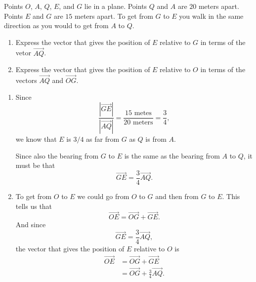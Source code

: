 \documentclass{ximera}
\begin{document}
\begin{question} \label{QLdfreFefrer}
Points $O$, $A$, $Q$, $E$, and $G$ lie in a plane. Points $Q$ and $A$ are $20$ meters apart. Points $E$ and $G$ are $15$ meters apart. To get from $G$ to $E$ you walk in the same direction as you would to get from $A$ to $Q$.

\begin{enumerate}
\item Express the vector that gives the position of $E$ relative to $G$ in terms of the vetor $\overrightarrow{AQ}$.

\item Express the vector that gives the position of $E$ relative to $O$ in terms of the vectors $\overrightarrow{AQ}$ and $\overrightarrow{OG}$.
\end{enumerate}

\begin{explanation}

\begin{enumerate}
\item  Since 
\[
 \frac{|\overrightarrow{GE}|}{|\overrightarrow{AQ}|} = \frac{15\text{ metes}}{20 \text{ meters}} = \frac{3}{4} ,
\]
we know that $E$ is $3/4$ as far from $G$ as $Q$ is from $A$.

Since also the bearing from $G$ to $E$ is the same as the bearing from $A$ to $Q$, it must be that
\[
          \overrightarrow{GE}     = \frac{3}{4}\overrightarrow{AQ} .
\]   

\item To get from $O$ to $E$ we could go from $O$ to $G$ and then from $G$ to $E$. This tells us that
\[
  \overrightarrow{OE} = \overrightarrow{OG} + \overrightarrow{GE} .
\]
And since 
\[
          \overrightarrow{GE}     = \frac{3}{4}\overrightarrow{AQ} ,
\]  
the vector that gives the position of $E$ relative to $O$ is 
\begin{align*}
   \overrightarrow{OE} &= \overrightarrow{OG} + \overrightarrow{GE} \\
                                 &=  \overrightarrow{OG} + \frac{3}{4}\overrightarrow{AQ}.
\end{align*}


\end{enumerate}
\end{explanation}
\end{question}
\end{document}
